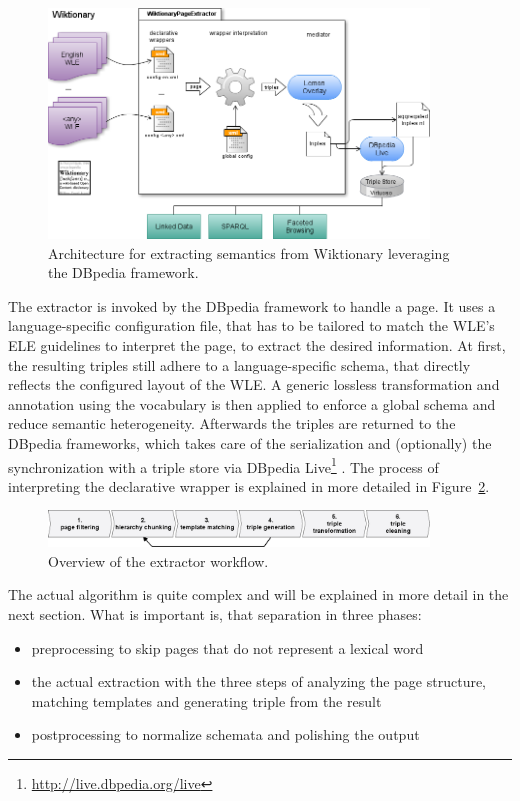 \begin{figure}[htb]
\centering
\includegraphics[width=0.9\textwidth]{./images/architecture.png}
\caption{Architecture for extracting semantics from Wiktionary leveraging the DBpedia framework.}
\label{fig:architecture}
\end{figure}
The \wik extractor is invoked by the DBpedia framework to handle a page.
It uses a language-specific configuration file, that has to be tailored to match the WLE's ELE guidelines to interpret the page, to extract the desired information. 
At first, the resulting triples still adhere to a language-specific schema, that directly reflects the configured layout of the WLE. 
A generic lossless transformation and annotation using the \lemon vocabulary is then applied to enforce a global schema and reduce semantic heterogeneity. 
Afterwards the triples are returned to the DBpedia frameworks, which takes care of the serialization and (optionally) the synchronization with a triple store via DBpedia Live\footnote{\url{http://live.dbpedia.org/live}} \cite{dbpedia_live_2012}.
The process of interpreting the declarative wrapper is explained in more detailed in Figure~\ref{fig:extractor}.

\begin{figure}[tb]
\centering
\includegraphics[width=0.9\textwidth]{./images/extractor.png}
\caption{Overview of the extractor workflow.}
\label{fig:extractor}
\end{figure}

The actual algorithm is quite complex and will be explained in more detail in the next section. What is important is, that separation in three phases: 
\begin{itemize}
\item preprocessing to skip pages that do not represent a lexical word
\item the actual extraction with the three steps of analyzing the page structure, matching templates and generating triple from the result
\item postprocessing to normalize schemata and polishing the output
\end{itemize}

